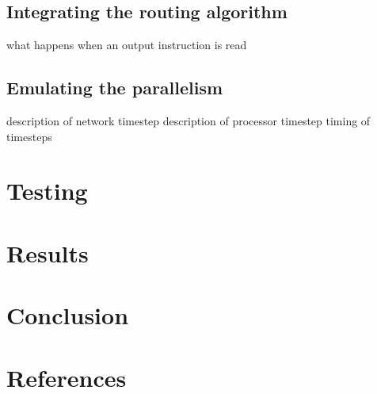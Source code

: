 \documentclass[a4paper, 12pt]{article}
\begin{document}
\subsection{Integrating the routing algorithm}

what happens when an output instruction is read

\subsection{Emulating the parallelism}
\label{sec:imp_parallelism}

description of network timestep
description of processor timestep
timing of timesteps

\newpage
\section{Testing}



\newpage
\section{Results}



\newpage
\section{Conclusion}



\newpage
\section{References}
\end{document}
